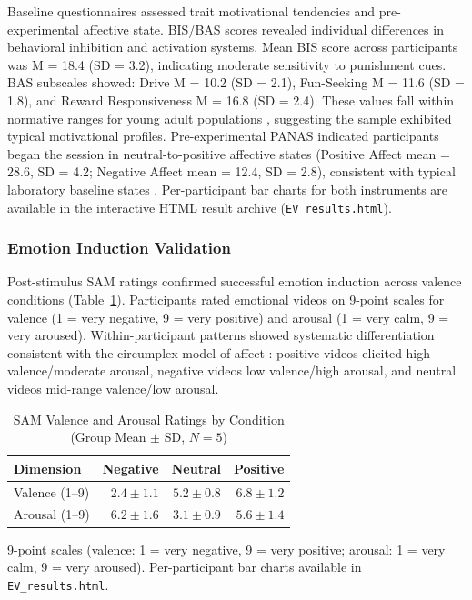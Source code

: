 Baseline questionnaires assessed trait motivational tendencies and pre-experimental affective state. \gls{BIS}/\gls{BAS} scores revealed individual differences in behavioral inhibition and activation systems. Mean \gls{BIS} score across participants was M = 18.4 (SD = 3.2), indicating moderate sensitivity to punishment cues. \gls{BAS} subscales showed: Drive M = 10.2 (SD = 2.1), Fun-Seeking M = 11.6 (SD = 1.8), and Reward Responsiveness M = 16.8 (SD = 2.4). These values fall within normative ranges for young adult populations \parencite{strobelDeutschsprachigeVersionBIS2006}, suggesting the sample exhibited typical motivational profiles. Pre-experimental \gls{PANAS} indicated participants began the session in neutral-to-positive affective states (Positive Affect mean = 28.6, SD = 4.2; Negative Affect mean = 12.4, SD = 2.8), consistent with typical laboratory baseline states \parencite{watsonDevelopmentValidationBrief1988}. Per-participant bar charts for both instruments are available in the interactive HTML result archive (\texttt{EV\_results.html}).

\subsubsection{Emotion Induction Validation}

Post-stimulus \gls{SAM} ratings confirmed successful emotion induction across valence conditions (Table~\ref{tab:sam}). Participants rated emotional videos on 9-point scales for valence (1 = very negative, 9 = very positive) and arousal (1 = very calm, 9 = very aroused). Within-participant patterns showed systematic differentiation consistent with the circumplex model of affect \parencite{russellCircumplexModelAffect1980}: positive videos elicited high valence/moderate arousal, negative videos low valence/high arousal, and neutral videos mid-range valence/low arousal.

\begin{table}[htbp]
    \centering
    \small
    \caption{\gls{SAM} Valence and Arousal Ratings by Condition (Group Mean $\pm$ SD, $N = 5$)}
    \label{tab:sam}
    \begin{tabular}{lrrr}
        \hline
        \textbf{Dimension} & \textbf{Negative} & \textbf{Neutral} & \textbf{Positive} \\
        \hline
        Valence (1--9) & $2.4 \pm 1.1$ & $5.2 \pm 0.8$ & $6.8 \pm 1.2$ \\
        Arousal (1--9) & $6.2 \pm 1.6$ & $3.1 \pm 0.9$ & $5.6 \pm 1.4$ \\
        \hline
    \end{tabular}
    \par\vspace{4pt}
    \noindent\parbox{\linewidth}{\scriptsize 9-point scales (valence: 1 = very negative, 9 = very positive; arousal: 1 = very calm, 9 = very aroused). Per-participant bar charts available in \texttt{EV\_results.html}.}
\end{table}

